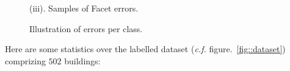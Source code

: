 \documentclass[a4paper, 11pt]{article}
\begin{document}
\begin{figure}
\begin{center}
{{\begin{subfloatrow}[4]
					\end{subfloatrow}
				}
				{
					\caption*{(iii). Samples of Facet errors.}
				}
			}
			{
				\caption{\label{fig::samples}Illustration of errors per class.}
			}
		\end{center}
	\end{figure}
	\clearpage

	Here are some statistics over the labelled dataset (\textit{c.f.} figure.~\ref{fig::dataset}) comprizing $502$ buildings:
\end{document}
